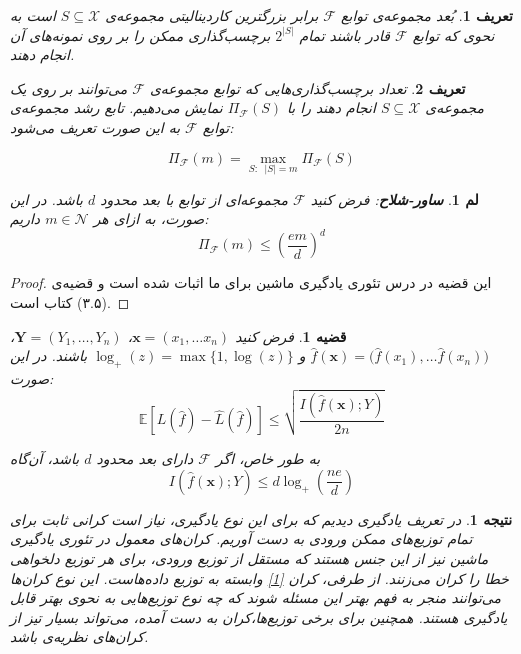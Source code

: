 \documentclass[a4paper,12pt]{article}
\newtheorem{den}{{\large\bf تعریف}}[section]
\newtheorem{lem}{{\large\bf لم}}[section]
\newtheorem{cor}{{\large\bf نتیجه}}[section]
\newtheorem{thm}{{\large\bf قضیه}}[section]
\newcommand{\E}{\mathbb{E}}
\newcommand{\N}{\mathcal{N}}
\begin{document}
\begin{den}
	بُعد 
	مجموعه‌ی توابع 
	$\mathcal{F}$
	برابر بزرگترین کاردینالیتی  مجموعه‌ی 
	$S \subseteq \mathcal{X}$
	است به نحوی که توابع 
	$\mathcal{F}$
	قادر باشند تمام 
	$2^{|S|}$
	برچسب‌گذاری‌ ممکن را بر روی  نمونه‌های آن انجام دهند.
\end{den}

\begin{den}
	تعداد برچسب‌گذاری‌هایی که توابع مجموعه‌ی 
	$\mathcal{F}$
	می‌توانند بر روی یک مجموعه‌ی 
	$S \subseteq \mathcal{X}$
	انجام دهند را با 
	$\Pi_\mathcal{F}(S)$
	نمایش می‌دهیم. تابع رشد مجموعه‌ی توابع 
	$\mathcal{F}$
	به این صورت تعریف می‌شود:
	
	$$\Pi_\mathcal{F}(m) = \max_{S:\;\; |S| = m} \Pi_\mathcal{F} (S)$$
	
	
\end{den}

\begin{lem}
	\textbf {ساور-شلاح}:
	فرض کنید 
	$\mathcal{F}$
	مجموعه‌ای از توابع با بعد 
	محدود 
	$d$
	باشد. در این صورت، به ازای هر 
	$m \in \N$
	داریم:
	\begin{equation}
	\Pi_\mathcal{F}(m) \leq (\frac{em}{d})^d
	\end{equation}
\end{lem}
\begin{proof}
	این قضیه در درس تئوری یادگیری ماشین برای ما اثبات شده است و قضیه‌ی 
	(۳.۵)
	کتاب 
	\cite{mohri2018foundations}
	است.
\end{proof}

\begin{thm}\label{thm_classification}
	فرض کنید 
	$\mathbf{x} = (x_1, \dots x_n)$،
	$\mathbf{Y} = (Y_1, \dots, Y_n)$،
	$\hat{f} (\mathbf{x}) = \big(\hat{f}(x_1), \dots \hat{f}(x_n)\big)$
	و
	$\log_+(z) = \max\{1, \log(z)\}$
	باشند. در این صورت:
	\begin{equation}
	\E[L(\hat{f}) - \hat{L}(\hat{f})] \leq \sqrt{ \frac{I(\hat{f} (\mathbf{x}); Y)}{2n}}
	\label{1}
	\end{equation}
	
	به طور خاص، اگر 
	$\mathcal{F}$
	دارای بعد 
	محدود 
	$d$
	باشد، آن‌گاه
	\begin{equation}
	I(\hat{f} (\mathbf{x}); Y) \leq d \log_+ (\frac{ne}{d})
	\label{2}
	\end{equation}
	
\end{thm}



\begin{cor}
	در تعریف یادگیری
	دیدیم که برای این نوع یادگیری، نیاز است کرانی ثابت برای تمام توزیع‌های ممکن ورودی به دست آوریم. کران‌های معمول در تئوری یادگیری ماشین نیز از این جنس هستند که مستقل از توزیع ورودی، برای هر توزیع دلخواهی خطا را کران می‌زنند. از طرفی، کران
	\eqref{1}
	وابسته به توزیع داده‌هاست. این نوع کران‌ها می‌توانند منجر به فهم بهتر این مسئله شوند که چه نوع توزیع‌هایی به نحوی بهتر قابل یادگیری هستند. همچنین برای برخی توزیع‌ها،‌کران به دست آمده، می‌تواند بسیار تیز از کران‌های نظریه‌ی 
	باشد.
\end{cor}
\end{document}
